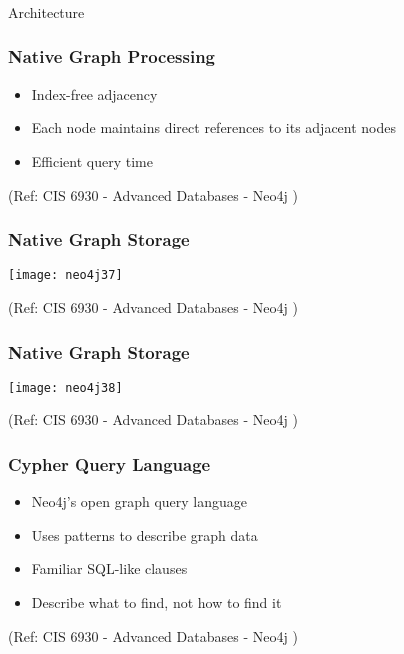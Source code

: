 \begin{frame}[fragile]\frametitle{}
\begin{center}
{\Large Architecture}
\end{center}
\end{frame}

\begin{frame}\frametitle{Native Graph Processing}



\begin{itemize}
\item Index-free adjacency
\item Each node maintains direct references to its adjacent nodes
\item Efficient query time
\end{itemize}

{\tiny (Ref: CIS 6930 - Advanced Databases - Neo4j )}
\end{frame}

\begin{frame}\frametitle{Native Graph Storage}

\begin{center}
\texttt{[image: neo4j37]}
\end{center}	  


{\tiny (Ref: CIS 6930 - Advanced Databases - Neo4j )}
\end{frame}

\begin{frame}\frametitle{Native Graph Storage}

\begin{center}
\texttt{[image: neo4j38]}
\end{center}	  


{\tiny (Ref: CIS 6930 - Advanced Databases - Neo4j )}
\end{frame}

\begin{frame}\frametitle{Cypher Query Language}

\begin{itemize}
\item Neo4j’s open graph query language
\item Uses patterns to describe graph data
\item Familiar SQL-like clauses
\item Describe what to find, not how to find it
\end{itemize}

{\tiny (Ref: CIS 6930 - Advanced Databases - Neo4j )}
\end{frame}
